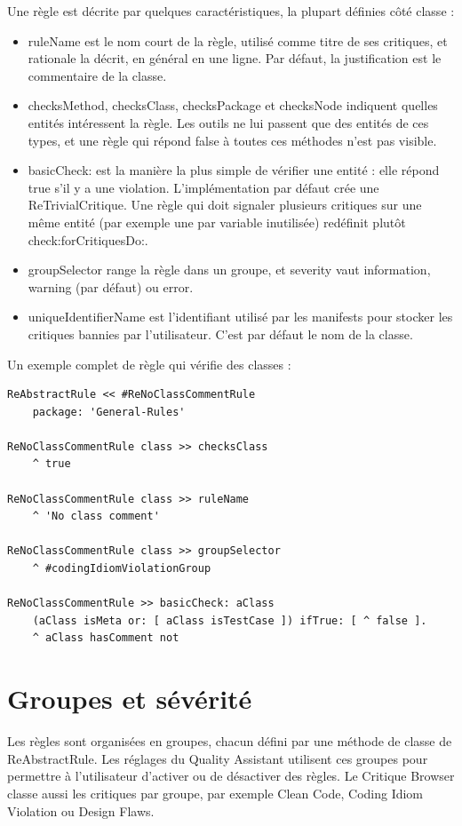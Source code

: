 \documentclass[11pt,a4paper]{report}
\begin{document}
Une règle est décrite par quelques caractéristiques, la plupart définies côté classe :

\begin{itemize}
  \item ruleName est le nom court de la règle, utilisé comme titre de ses critiques, et rationale la décrit, en général en une ligne. Par défaut, la justification est le commentaire de la classe.
  \item checksMethod, checksClass, checksPackage et checksNode indiquent quelles entités intéressent la règle. Les outils ne lui passent que des entités de ces types, et une règle qui répond false à toutes ces méthodes n’est pas visible.
  \item basicCheck: est la manière la plus simple de vérifier une entité : elle répond true s’il y a une violation. L’implémentation par défaut crée une ReTrivialCritique. Une règle qui doit signaler plusieurs critiques sur une même entité (par exemple une par variable inutilisée) redéfinit plutôt check:forCritiquesDo:.
  \item groupSelector range la règle dans un groupe, et severity vaut information, warning (par défaut) ou error.
  \item uniqueIdentifierName est l’identifiant utilisé par les manifests pour stocker les critiques bannies par l’utilisateur. C’est par défaut le nom de la classe.
\end{itemize}

Un exemple complet de règle qui vérifie des classes :

\begin{lstlisting}
ReAbstractRule << #ReNoClassCommentRule
	package: 'General-Rules'

ReNoClassCommentRule class >> checksClass
	^ true

ReNoClassCommentRule class >> ruleName
	^ 'No class comment'

ReNoClassCommentRule class >> groupSelector
	^ #codingIdiomViolationGroup

ReNoClassCommentRule >> basicCheck: aClass
	(aClass isMeta or: [ aClass isTestCase ]) ifTrue: [ ^ false ].
	^ aClass hasComment not
\end{lstlisting}

\section{Groupes et sévérité}
Les règles sont organisées en groupes, chacun défini par une méthode de classe de ReAbstractRule. Les réglages du Quality Assistant utilisent ces groupes pour permettre à l’utilisateur d’activer ou de désactiver des règles. Le Critique Browser classe aussi les critiques par groupe, par exemple Clean Code, Coding Idiom Violation ou Design Flaws.
\end{document}
